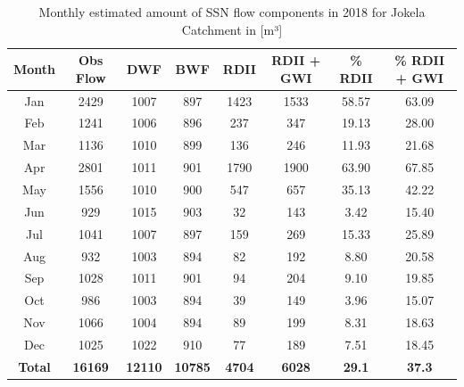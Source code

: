 \begin{table}[ht]
\caption{Monthly estimated amount of \acf{SSN} flow components in 2018 for Jokela Catchment in [m³]}
\label{tbl:RDIIestimate}
\centering
\begin{tabular}{cccccccc}
\toprule
\textbf{Month} & \textbf{Obs Flow} & \textbf{DWF}   & \textbf{BWF}   & \textbf{RDII} & \textbf{RDII + GWI} & \textbf{\% RDII} & \textbf{\% RDII + GWI} \\ \hline
Jan            & 2429              & 1007           & 897            & 1423          & 1533                & 58.57            & 63.09                  \\
Feb            & 1241              & 1006           & 896            & 237           & 347                 & 19.13            & 28.00                  \\
Mar            & 1136              & 1010           & 899            & 136           & 246                 & 11.93            & 21.68                  \\
Apr            & 2801              & 1011           & 901            & 1790          & 1900                & 63.90            & 67.85                  \\
May            & 1556              & 1010           & 900            & 547           & 657                 & 35.13            & 42.22                  \\
Jun            & 929               & 1015           & 903            & 32            & 143                 & 3.42             & 15.40                  \\
Jul            & 1041              & 1007           & 897            & 159           & 269                 & 15.33            & 25.89                  \\
Aug            & 932               & 1003           & 894            & 82            & 192                 & 8.80             & 20.58                  \\
Sep            & 1028              & 1011           & 901            & 94            & 204                 & 9.10             & 19.85                  \\
Oct            & 986               & 1003           & 894            & 39            & 149                 & 3.96             & 15.07                  \\
Nov            & 1066              & 1004           & 894            & 89            & 199                 & 8.31             & 18.63                  \\
Dec            & 1025              & 1022           & 910            & 77            & 189                 & 7.51             & 18.45                  \\ \hline
\textbf{Total} & \textbf{16169}    & \textbf{12110} & \textbf{10785} & \textbf{4704} & \textbf{6028}       & \textbf{29.1}    & \textbf{37.3}   \\ \bottomrule      
\end{tabular}
\end{table}

